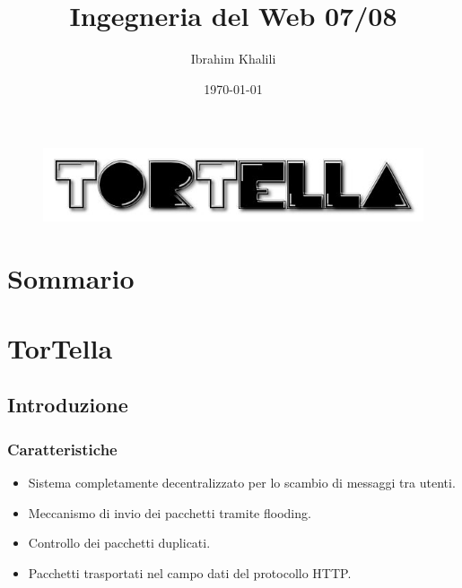\documentclass[a4paper,italian,12pt]{beamer}
\title{Ingegneria del Web 07/08}
\institute{Università di Roma Tor Vergata}
\author{Ibrahim Khalili}
\date{\today}
\begin{document}
	\begin{frame}
		\titlepage
		\begin{figure}[H]
			\begin{center}
				\includegraphics[scale=0.4]{etc/tortellalogo.jpg}
			\end{center}
		\end{figure}
	\end{frame}

    \section{Sommario}
	    \frame{\tableofcontents}

    \section{TorTella}
    	\subsection{Introduzione}
    		\begin{frame}
    			\frametitle{Caratteristiche}
    			\begin{itemize}
    				\item Sistema completamente decentralizzato per lo scambio di messaggi tra utenti.
					\vspace{2mm}    				
    				\item Meccanismo di invio dei pacchetti tramite flooding.
					\vspace{2mm}    				
    				\item Controllo dei pacchetti duplicati.
					\vspace{2mm}    				
    				\item Pacchetti trasportati nel campo dati del protocollo HTTP. 
    			\end{itemize}
    		\end{frame}
\end{document}
